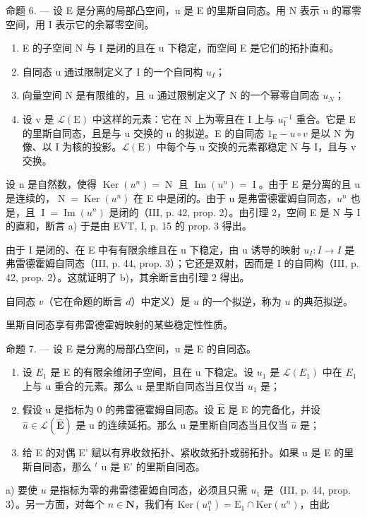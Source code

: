 命题 6. --- 设 E 是分离的局部凸空间，u 是 E 的里斯自同态。用 N 表示 u 的幂零空间，用 I 表示它的余幂零空间。

\begin{enumerate}
\def\labelenumi{\alph{enumi})}
\item
  E 的子空间 N 与 I 是闭的且在 u 下稳定，而空间 E 是它们的拓扑直和。
\item
  自同态 u 通过限制定义了 I 的一个自同构 \(u_{I}\)；
\item
   向量空间 N 是有限维的，且 u 通过限制定义了 N 的一个幂零自同态 \(u_{N}\)；
\item
  设 v 是 \(\mathcal{L}(\mathrm{E})\) 中这样的元素：它在 N 上为零且在 I 上与 \(u_{\mathrm{I}}^{-1}\) 重合。它是 E 的里斯自同态，且是与 u 交换的 u 的拟逆。E 的自同态 \(1_{\mathrm{E}} - u \circ v\) 是以 N 为像、以 I 为核的投影。\(\mathcal{L}(\mathrm{E})\) 中每个与 u 交换的元素都稳定 N 与 I，且与 v 交换。
\end{enumerate}

设 n 是自然数，使得 \(\operatorname{Ker}(u^{n}) = \operatorname{N}\) 且 \(\operatorname{Im}(u^{n}) = \operatorname{I}\)。由于 E 是分离的且 u 是连续的，\(\operatorname{N} = \operatorname{Ker}(u^{n})\) 在 E 中是闭的。由于 u 是弗雷德霍姆自同态，\(u^{n}\) 也是，且 \(\operatorname{I} = \operatorname{Im}(u^{n})\) 是闭的（III, p. 42, prop. 2）。由引理 2，空间 E 是 N 与 I 的直和，断言 a) 于是由 EVT, I, p. 15 的 prop. 3 得出。

由于 I 是闭的、在 E 中有有限余维且在 u 下稳定，由 u 诱导的映射 \(u_{I}\colon I \to I\) 是弗雷德霍姆自同态（III, p. 44, prop. 3）；它还是双射，因而是 I 的自同构（III, p. 42, prop. 2）。这就证明了 b)，其余断言由引理 2 得出。

自同态 \(v\)（它在命题的断言 \(d\)）中定义）是 \(u\) 的一个拟逆，称为 \(u\) 的典范拟逆。

里斯自同态享有弗雷德霍姆映射的某些稳定性性质。

命题 7. — 设 E 是分离的局部凸空间，u 是 E 的自同态。

\begin{enumerate}
\def\labelenumi{\alph{enumi})}
\item
   设 \(E_{1}\) 是 E 的有限余维闭子空间，且在 u 下稳定。设 \(u_{1}\) 是 \(\mathcal{L}(E_{1})\) 中在 \(E_{1}\) 上与 u 重合的元素。那么 u 是里斯自同态当且仅当 \(u_{1}\) 是；
\item
   假设 u 是指标为 0 的弗雷德霍姆自同态。设 \(\widehat{\mathbf{E}}\) 是 E 的完备化，并设 \(\widehat{u} \in \mathcal{L}(\widehat{\mathbf{E}})\) 是 u 的连续延拓。那么 u 是里斯自同态当且仅当 \(\widehat{u}\) 是；
\item
 给 E 的对偶 E' 赋以有界收敛拓扑、紧收敛拓扑或弱拓扑。如果 u 是 E 的里斯自同态，那么 \(^{t}\) u 是 E' 的里斯自同态。
\end{enumerate}
a) 要使 \(u\) 是指标为零的弗雷德霍姆自同态，必须且只需 \(u_1\) 是（III, p. 44, prop. 3）。另一方面，对每个 \(n \in \mathbf{N}\)，我们有 \(\mathrm{Ker}(u_1^n) = \mathrm{E}_1 \cap \mathrm{Ker}(u^n)\)，由此



